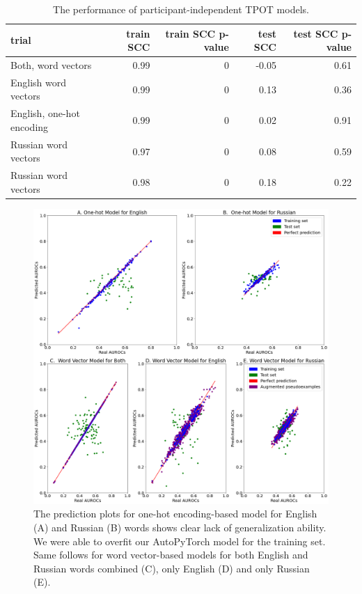 \documentclass[12pt,letterpaper]{article}
\begin{document}
\begin{enumerate}
\begin{table}[h!]
\centering
\caption{The performance of participant-independent TPOT models.}
\begin{tabular}{|l|r|r|r|r|} \hline
trial &  train SCC &  train SCC p-value &  test SCC &  test SCC p-value \\ \hline
Both, word vectors &   0.99 &       0 & -0.05 &          0.61 \\ \hline
English word vectors &   0.99 &      0 &  0.13 &          0.36 \\ \hline
English, one-hot encoding &   0.99 &      0 &  0.02 &          0.91 \\ \hline
Russian word vectors &   0.97 &      0 &  0.08 &          0.59 \\ \hline
Russian word vectors &   0.98 &      0 &  0.18 &          0.22 \\ \hline
\end{tabular}

\end{table}

\begin{figure}[h!]
\centering
\includegraphics[width=0.8\linewidth]{figures/Appendix3.png}
\caption{The prediction plots for one-hot encoding-based model for English (A) and Russian (B) words shows clear lack of generalization ability. We were able to overfit our AutoPyTorch model for the training set. Same follows for word vector-based models for both English and Russian words combined (C), only English (D) and only Russian (E).
}
\end{figure}


\end{enumerate}
\end{document}

